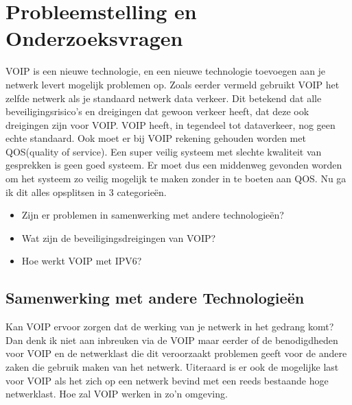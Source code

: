 \documentclass[pdftex,a4paper,12pt,twoside]{report}
\begin{document}
\newpage

\section{Probleemstelling en Onderzoeksvragen}
\label{sec:onderzoeksvragen}
VOIP is een nieuwe technologie, en een nieuwe technologie toevoegen aan je netwerk levert mogelijk problemen op. 
Zoals eerder vermeld gebruikt VOIP het zelfde netwerk als je standaard netwerk data verkeer. Dit betekend dat alle beveiligingsrisico's en dreigingen dat gewoon verkeer heeft, dat deze ook dreigingen zijn voor VOIP. VOIP heeft, in tegendeel tot dataverkeer, nog geen echte standaard. Ook moet er bij VOIP rekening gehouden worden met QOS(quality of service). Een super veilig systeem met slechte kwaliteit van gesprekken is geen goed systeem. Er moet dus een middenweg gevonden worden om het systeem zo veilig mogelijk te maken zonder in te boeten aan QOS.
Nu ga ik dit alles opsplitsen in 3 categorieën.

\begin{itemize}
	\item Zijn er problemen in samenwerking met andere technologieën?
	\item Wat zijn de beveiligingsdreigingen van VOIP?
	\item Hoe werkt VOIP met IPV6?
\end{itemize}

\subsection{Samenwerking met andere Technologieën}

Kan VOIP ervoor zorgen dat de werking van je netwerk in het gedrang komt? Dan denk ik niet aan inbreuken via de VOIP maar eerder of de benodigdheden voor VOIP en de netwerklast die dit veroorzaakt problemen geeft voor de andere zaken die gebruik maken van het netwerk. Uiteraard is er ook de mogelijke last voor VOIP als het zich op een netwerk bevind met een reeds bestaande hoge netwerklast. Hoe zal VOIP werken in zo'n omgeving.
\end{document}
